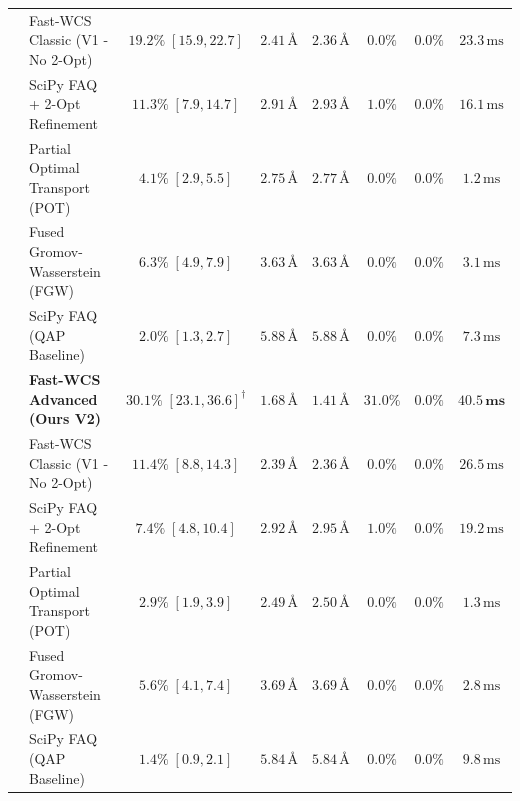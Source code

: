\documentclass[conference]{IEEEtran}
\begin{document}
\begin{table}[t]
\begin{tabular*}{\textwidth}{@{\extracolsep{\fill}}llcccccc@{}}
& Fast-WCS Classic (V1 - No 2-Opt) & $19.2\% \; [15.9, 22.7]$ & $2.41\,\text{\AA}$ & $2.36\,\text{\AA}$ & $0.0\%$ & $0.0\%$ & $23.3\,\text{ms}$ \\
& SciPy FAQ + 2-Opt Refinement & $11.3\% \; [7.9, 14.7]$ & $2.91\,\text{\AA}$ & $2.93\,\text{\AA}$ & $1.0\%$ & $0.0\%$ & $16.1\,\text{ms}$ \\
& Partial Optimal Transport (POT) \cite{peyre2019computational} & $4.1\% \; [2.9, 5.5]$ & $2.75\,\text{\AA}$ & $2.77\,\text{\AA}$ & $0.0\%$ & $0.0\%$ & $1.2\,\text{ms}$ \\
& Fused Gromov-Wasserstein (FGW) \cite{titouan2019optimal} & $6.3\% \; [4.9, 7.9]$ & $3.63\,\text{\AA}$ & $3.63\,\text{\AA}$ & $0.0\%$ & $0.0\%$ & $3.1\,\text{ms}$ \\
& SciPy FAQ (QAP Baseline) \cite{vogelstein2015fast} & $2.0\% \; [1.3, 2.7]$ & $5.88\,\text{\AA}$ & $5.88\,\text{\AA}$ & $0.0\%$ & $0.0\%$ & $7.3\,\text{ms}$ \\
\midrule
{}
& \textbf{Fast-WCS Advanced (Ours V2)} & $\mathbf{30.1\% \; [23.1, 36.6]^\dagger}$ & $\mathbf{1.68\,\text{\AA}}$ & $\mathbf{1.41\,\text{\AA}}$ & $\mathbf{31.0\%}$ & $\mathbf{0.0\%}$ & $\mathbf{40.5\,\text{ms}}$ \\
& Fast-WCS Classic (V1 - No 2-Opt) & $11.4\% \; [8.8, 14.3]$ & $2.39\,\text{\AA}$ & $2.36\,\text{\AA}$ & $0.0\%$ & $0.0\%$ & $26.5\,\text{ms}$ \\
& SciPy FAQ + 2-Opt Refinement & $7.4\% \; [4.8, 10.4]$ & $2.92\,\text{\AA}$ & $2.95\,\text{\AA}$ & $1.0\%$ & $0.0\%$ & $19.2\,\text{ms}$ \\
& Partial Optimal Transport (POT) \cite{peyre2019computational} & $2.9\% \; [1.9, 3.9]$ & $2.49\,\text{\AA}$ & $2.50\,\text{\AA}$ & $0.0\%$ & $0.0\%$ & $1.3\,\text{ms}$ \\
& Fused Gromov-Wasserstein (FGW) \cite{titouan2019optimal} & $5.6\% \; [4.1, 7.4]$ & $3.69\,\text{\AA}$ & $3.69\,\text{\AA}$ & $0.0\%$ & $0.0\%$ & $2.8\,\text{ms}$ \\
& SciPy FAQ (QAP Baseline) \cite{vogelstein2015fast} & $1.4\% \; [0.9, 2.1]$ & $5.84\,\text{\AA}$ & $5.84\,\text{\AA}$ & $0.0\%$ & $0.0\%$ & $9.8\,\text{ms}$ \\
\bottomrule
\end{tabular*}
\end{table}
\end{document}
